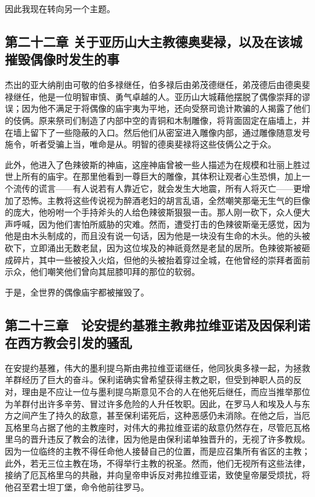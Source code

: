 因此我现在转向另一个主题。\par


\subsection{第二十二章 关于亚历山大主教德奥斐禄，以及在该城摧毁偶像时发生的事}

杰出的亚大纳削由可敬的伯多禄继任，伯多禄后由弟茂德继任，弟茂德后由德奥斐禄继任，他是一位明智审慎、勇气卓越的人。亚历山大城藉他摆脱了偶像崇拜的谬误；因为他不满足于将偶像的庙宇夷为平地，还向受祭司诡计欺骗的人揭露了他们的伎俩。原来祭司们制造了内部中空的青铜和木制雕像，将背面固定在庙墙上，并在墙上留下了一些隐蔽的入口。然后他们从密室进入雕像内部，通过雕像随意发号施令，听者受骗上当，唯命是从。明智的德奥斐禄将这些伎俩公之于众。\par

此外，他进入了色辣彼斯的神庙，这座神庙曾被一些人描述为在规模和壮丽上胜过世上所有的庙宇。在那里他看到一尊巨大的雕像，其体积让观者心生恐惧，加上一个流传的谎言——有人说若有人靠近它，就会发生大地震，所有人将灭亡——更增加了恐怖。主教将这些传说视为醉酒老妇的胡言乱语，全然嘲笑那毫无生气的巨像的庞大，他吩咐一个手持斧头的人给色辣彼斯狠狠一击。那人刚一砍下，众人便大声呼喊，因为他们害怕所威胁的灾难。然而，遭受打击的色辣彼斯毫无感觉，因为他是由木头制成的，而且没有说一句话，因为他是一块没有生命的木头。他的头被砍下，立即涌出无数老鼠，因为这位埃及的神祇竟然是老鼠的居所。色辣彼斯被砸成碎片，其中一些被投入火焰，但他的头被抬着穿过全城，在他曾经的崇拜者面前示众，他们嘲笑他们曾向其屈膝叩拜的那位的软弱。\par

于是，全世界的偶像庙宇都被摧毁了。\par


\subsection{第二十三章　论安提约基雅主教弗拉维亚诺及因保利诺在西方教会引发的骚乱}

在安提约基雅，伟大的墨利提乌斯由弗拉维亚诺继任，他同狄奥多禄一起，为拯救羊群经历了巨大的奋斗。保利诺确实曾希望获得主教之职，但受到神职人员的反对，理由是不应让一位与墨利提乌斯意见不合的人在他死后继任，而应当推举那位为羊群付出许多辛劳、冒过许多危险的人升任牧职。因此，在罗马人和埃及人与东方之间产生了持久的敌意，甚至保利诺死后，这种恶感仍未消除。在他之后，当厄瓦格里乌占据了他的主教座时，对伟大的弗拉维亚诺的敌意仍然存在，尽管厄瓦格里乌的晋升违反了教会的法律，因为他是由保利诺单独晋升的，无视了许多教规。因为一位临终的主教不得任命他人接替自己的位置，而是应召集所有省区的主教；此外，若无三位主教在场，不得举行主教的祝圣。然而，他们无视所有这些法律，接纳了厄瓦格里乌的共融，并向皇帝申诉反对弗拉维亚诺，致使皇帝屡受烦扰，将他召至君士坦丁堡，命令他前往罗马。\par

